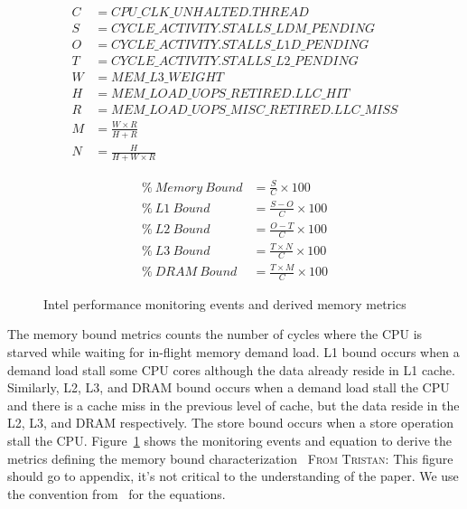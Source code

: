 \documentclass[conference]{IEEEtran}
\newcommand{\TG}[1]{\color{blue}\textsc{From Tristan: }#1\color{black}}
\begin{document}
\begin{figure}[ht]
	\noindent
	\begin{minipage}
		{0.5\textwidth}
		\begin{align*}
			C & = CPU\_CLK\_UNHALTED.THREAD                \\
			S & = CYCLE\_ACTIVITY.STALLS\_LDM\_PENDING     \\
			O & = CYCLE\_ACTIVITY.STALLS\_L1D\_PENDING     \\
			T & = CYCLE\_ACTIVITY.STALLS\_L2\_PENDING      \\
			W & = MEM\_L3\_WEIGHT                          \\
			H & = MEM\_LOAD\_UOPS\_RETIRED.LLC\_HIT        \\
			R & = MEM\_LOAD\_UOPS\_MISC\_RETIRED.LLC\_MISS \\
			M & = \frac{W \times R}{H + R}                 \\
			N & = \frac{H}{H + W \times R}                 
		\end{align*}
	\end{minipage}
	\begin{minipage}
		{0.5\textwidth}
		\begin{align}
			\%~Memory~Bound & = \frac{S}{C} \times 100          \\
			\%~L1~Bound     & = \frac{S - O}{C} \times 100      \\
			\%~L2~Bound     & = \frac{O - T}{C} \times 100      \\
			\%~L3~Bound     & = \frac{T \times N}{C} \times 100 \\
			\%~DRAM~Bound   & = \frac{T \times M}{C} \times 100 
		\end{align}
	\end{minipage}
	\caption{Intel performance monitoring events and derived memory metrics}
	\label{fig:memory-metrics}
\end{figure}	
The memory bound metrics counts the number of cycles where the CPU is starved while waiting for in-flight memory demand load. L1 bound occurs when a demand load stall some CPU cores although the data already reside in L1 cache. Similarly, L2, L3, and DRAM bound occurs when a demand load stall the CPU and there is a cache miss in the previous level of cache, but the data reside in the L2, L3, and DRAM respectively. The store bound occurs when a store operation stall the CPU. Figure~\ref{fig:memory-metrics} shows the monitoring events and equation to derive the metrics defining the memory bound characterization~\cite{Intel2006-lc} \TG{This figure should go to appendix, it's not critical to the understanding of the paper}. We use the convention from~\cite{Kukunas2015-jd} for the equations.
			
\end{document}

